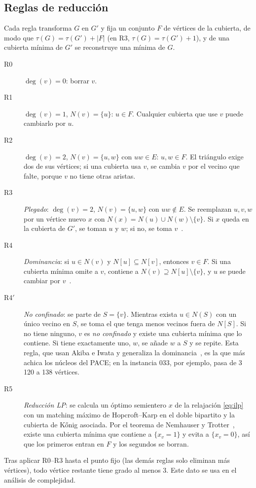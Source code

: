 \subsection{Reglas de reducción}
\begin{lemma}\label{lem:reglas}
Cada regla transforma $G$ en $G'$ y fija un conjunto $F$ de vértices de la cubierta, de modo que $\tau(G)=\tau(G')+|F|$ (en R3, $\tau(G)=\tau(G')+1$), y de una cubierta mínima de $G'$ se reconstruye una mínima de $G$.
\begin{description}
  \item[R0] $\deg(v)=0$: borrar $v$.
  \item[R1] $\deg(v)=1$, $N(v)=\{u\}$: $u\in F$. Cualquier cubierta que use $v$ puede cambiarlo por $u$.
  \item[R2] $\deg(v)=2$, $N(v)=\{u,w\}$ con $uw\in E$: $u,w\in F$. El triángulo exige dos de sus vértices; si una cubierta usa $v$, se cambia $v$ por el vecino que falte, porque $v$ no tiene otras aristas.
  \item[R3] \emph{Plegado}: $\deg(v)=2$, $N(v)=\{u,w\}$ con $uw\notin E$. Se reemplazan $u,v,w$ por un vértice nuevo $x$ con $N(x)=N(u)\cup N(w)\setminus\{v\}$. Si $x$ queda en la cubierta de $G'$, se toman $u$ y $w$; si no, se toma $v$~\citep{cygan2015}.
  \item[R4] \emph{Dominancia}: si $u\in N(v)$ y $N[u]\subseteq N[v]$, entonces $v\in F$. Si una cubierta mínima omite a $v$, contiene a $N(v)\supseteq N[u]\setminus\{v\}$, y $u$ se puede cambiar por $v$~\citep{akiba2016}.
  \item[R4$'$] \emph{No confinado}: se parte de $S=\{v\}$. Mientras exista $u\in N(S)$ con un único vecino en $S$, se toma el que tenga menos vecinos fuera de $N[S]$. Si no tiene ninguno, $v$ es \emph{no confinado} y existe una cubierta mínima que lo contiene. Si tiene exactamente uno, $w$, se añade $w$ a $S$ y se repite. Esta regla, que usan Akiba e Iwata y generaliza la dominancia~\citep{akiba2016}, es la que más achica los núcleos del PACE; en la instancia 033, por ejemplo, pasa de 3\,120 a 138 vértices.
  \item[R5] \emph{Reducción LP}: se calcula un óptimo semientero $x$ de la relajación \eqref{eq:ilp} con un matching máximo de Hopcroft--Karp en el doble bipartito y la cubierta de Kőnig asociada. Por el teorema de Nemhauser y Trotter~\citep{nemhauser1975}, existe una cubierta mínima que contiene a $\{x_v=1\}$ y evita a $\{x_v=0\}$, así que los primeros entran en $F$ y los segundos se borran.
\end{description}
\end{lemma}
Tras aplicar R0--R3 hasta el punto fijo (las demás reglas solo eliminan más vértices), todo vértice restante tiene grado al menos $3$. Este dato se usa en el análisis de complejidad.

